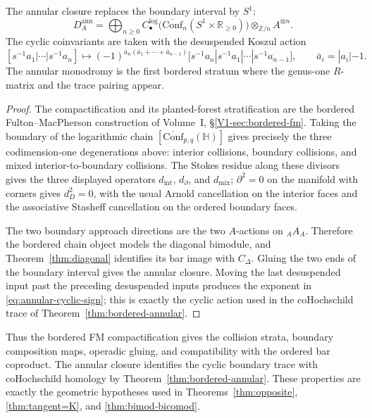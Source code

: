 \begin{theorem}
The annular closure replaces the boundary interval by \(S^1\):
\begin{equation}\label{eq:bordered-annular-closure}
D_A^{\mathrm{ann}}
=
\bigoplus_{n\geq0}
C_\bullet^{\log}\!\bigl(
\overline{\mathrm{Conf}}_n(S^1\times\mathbb R_{\geq0})
\bigr)\otimes_{\mathbb Z/n}A^{\otimes n}.
\end{equation}
The cyclic coinvariants are taken with the desuspended Koszul action
\begin{equation}\label{eq:annular-cyclic-sign}
[s^{-1}a_1|\cdots|s^{-1}a_n]
\longmapsto
(-1)^{\bar a_n(\bar a_1+\cdots+\bar a_{n-1})}
[s^{-1}a_n|s^{-1}a_1|\cdots|s^{-1}a_{n-1}],
\qquad
\bar a_i=|a_i|-1.
\end{equation}
The annular monodromy is the first bordered stratum where the
genus-one \(R\)-matrix and the trace pairing appear.
\end{theorem}

\begin{proof}
The compactification and its planted-forest stratification are the
bordered Fulton--MacPherson construction of Volume~I,
\S\ref*{V1-sec:bordered-fm}. Taking the boundary of the logarithmic
chain \([\overline{\mathrm{Conf}}_{p,q}(\mathbb H)]\) gives precisely
the three codimension-one degenerations above: interior collisions,
boundary collisions, and mixed interior-to-boundary collisions. The
Stokes residue along these divisors gives the three displayed
operators \(d_{\mathrm{int}}\), \(d_\partial\), and \(d_{\mathrm{mix}}\);
\(\partial^2=0\) on the manifold with corners gives \(d_D^2=0\), with
the usual Arnold cancellation on the interior faces and the
associative Stasheff cancellation on the ordered boundary faces.

The two boundary approach directions are the two \(A\)-actions on
\({}_AA_A\). Therefore the bordered chain object models the diagonal
bimodule, and Theorem~\ref{thm:diagonal} identifies its bar image with
\(C_\Delta\). Gluing the two ends of the boundary interval gives the
annular closure. Moving the last desuspended input past the preceding
desuspended inputs produces the exponent in
\eqref{eq:annular-cyclic-sign}; this is exactly the cyclic action used
in the coHochschild trace of Theorem~\ref{thm:bordered-annular}.
\end{proof}

Thus the bordered FM compactification gives the collision strata,
boundary composition maps, operadic gluing, and compatibility with the
ordered bar coproduct. The annular closure identifies the cyclic
boundary trace with coHochschild homology by
Theorem~\ref{thm:bordered-annular}. These properties are exactly the
geometric hypotheses used in Theorems~\ref{thm:opposite},
\ref{thm:tangent=K}, and \ref{thm:bimod-bicomod}.

